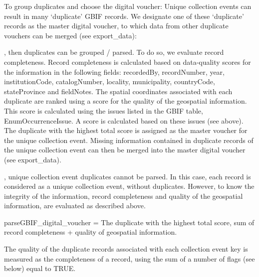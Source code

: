 \documentclass[a4paper]{book}
\begin{document}
%
\begin{Description}
To group duplicates and choose the digital voucher:
Unique collection events can result in many ‘duplicate’ GBIF records. We designate one of these ‘duplicate’ records
as the master digital voucher, to which data from other duplicate vouchers can be merged (see export\_data):

, then duplicates can be grouped / parsed.
To do so, we evaluate record completeness. Record completeness is calculated based on data-quality scores
for the information in the following  fields: recordedBy, recordNumber, year, institutionCode, catalogNumber, locality, municipality,
countryCode, stateProvince and fieldNotes. The spatial coordinates associated with each duplicate are ranked using a score for the
quality of the geospatial information. This score is calculated using the issues listed in the GBIF table, EnumOccurrenceIssue.
A score is calculated based on these issues (see above). The duplicate with the highest total score is assigned as the master voucher
for the unique collection event. Missing information contained in duplicate records of the unique collection event can then be merged
into the master digital voucher (see export\_data).

, unique collection event duplicates cannot be parsed. In this case,
each record is considered as a unique collection event, without duplicates. However, to know the integrity
of the information, record completeness and quality of the geospatial information, are evaluated as described above.

parseGBIF\_digital\_voucher = The duplicate with the highest total score, sum of record completeness + quality of geospatial information.

The quality of the duplicate records associated with each collection event key is measured as the
completeness of a record, using the sum of a number of flags (see below) equal to TRUE.

\begin{itemize}


\end{itemize}
\end{Description}
\end{document}
